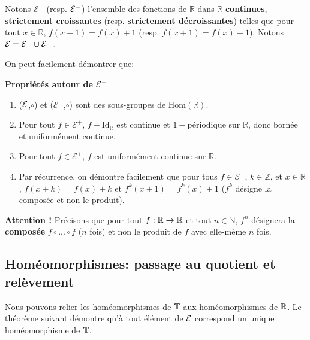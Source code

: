 \begin{notation}
	Notons $\mathcal{E}^+$ (resp. ${\mathcal{E}}^-$) l'ensemble des fonctions de $\mathbb{R}$ dans $\mathbb{R}$ \textbf{continues}, \textbf{strictement croissantes} (resp. \textbf{strictement décroissantes}) telles que pour tout $x \in \mathbb{R}$, $f(x+1) = f(x)+1$ (resp. $f(x+1)=f(x)-1$). Notons ${\mathcal{E}} = {\mathcal{E}}^+ \cup {\mathcal{E}}^-$.
\end{notation}
	On peut facilement démontrer que:

\begin{proposition}\label{E+}\textbf{Propriétés autour de ${\mathcal{E}}^+$}
	\begin{enumerate}
	\item (${\mathcal{E}}$,$\circ$) et ($\mathcal{E}^+$,$\circ$) sont des sous-groupes de $\mathrm{Hom}(\mathbb{R})$.
	\item Pour tout $f \in \mathcal{E}^+$, $f - \mathrm{Id_{\mathbb{R}}}$ est continue et $1-$périodique sur $\mathbb{R}$, donc bornée et uniformément continue.
	\item Pour tout  $f \in \mathcal{E}^+$, $f$ est uniformément continue sur $\mathbb{R}$.
	\item	Par récurrence, on démontre facilement que pour tous $f \in \mathcal{E}^+$, $k \in \mathbb{Z}$, et $x \in \mathbb{R}$, $f(x+k)=f(x)+k$ et $f^k(x+1)=f^k(x)+1$ ($f^k$ désigne la composée et non le produit).
\end{enumerate}
	\end{proposition}






\begin{notation}
	\textbf{Attention !}  Précisons que pour tout $f: {\mathbb{R}} \to {\mathbb{R}}$ et tout $n\in \mathbb{N}$, $f^n$ désignera la \textbf{composée} $f\circ...\circ f$ ($n$ fois) et non le produit de $f$ avec elle-même $n$ fois.
\end{notation}











\subsection{Homéomorphismes: passage au quotient et relèvement}
	Nous pouvons relier les homéomorphismes de ${\mathbb{T}}$ aux homéomorphismes de ${\mathbb{R}}$. Le théorème suivant démontre qu'à tout élément de ${\mathcal{E}}$ correspond un unique homéomorphisme de ${\mathbb{T}}$.























